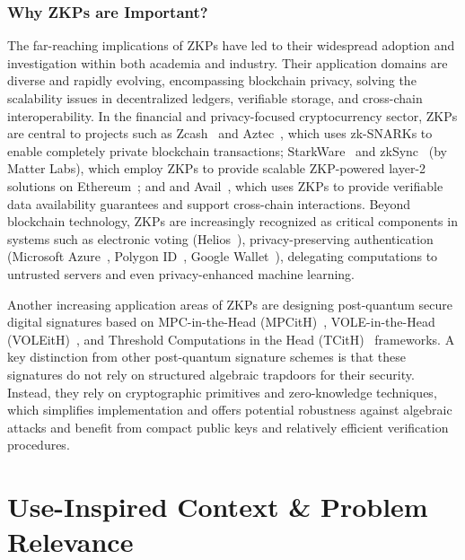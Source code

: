 \subsubsection{Why ZKPs are Important?}
\vspace*{-0.1cm}
The far-reaching implications of ZKPs have led to their widespread adoption and investigation within both academia and industry.
Their application domains are diverse and rapidly evolving, encompassing blockchain privacy, solving the scalability issues in decentralized ledgers, verifiable storage, and cross-chain interoperability.
In the financial and privacy-focused cryptocurrency sector, ZKPs are central to projects such as Zcash~\cite{zcash} and Aztec~\cite{aztec}, which uses zk-SNARKs to enable completely private blockchain transactions; StarkWare~\cite{starkware} and zkSync~\cite{zksync} (by Matter Labs), which employ ZKPs to provide scalable ZKP-powered layer-2 solutions on Ethereum~\cite{ethereum}; and and Avail~\cite{avail}, which uses ZKPs to provide verifiable data availability guarantees and support cross-chain interactions. 
Beyond blockchain technology, ZKPs are increasingly recognized as critical components in systems such as electronic voting (Helios~\cite{helios}), privacy-preserving authentication (Microsoft Azure~\cite{azureprivacy}, Polygon ID~\cite{polygonid}, Google Wallet~\cite{googlewallet}), delegating computations to untrusted servers and even privacy-enhanced machine learning.

Another increasing application areas of ZKPs are designing post-quantum secure digital signatures based on MPC-in-the-Head (MPCitH)~\cite{}, VOLE-in-the-Head (VOLEitH)~\cite{}, and Threshold Computations in the Head (TCitH)~\cite{} frameworks.
A key distinction from other post-quantum signature schemes is that these signatures do not rely on structured algebraic trapdoors for their security.
Instead, they rely on cryptographic primitives and zero-knowledge techniques, which simplifies implementation and offers potential robustness against algebraic attacks and benefit from compact public keys and relatively efficient verification procedures.

\section{Use-Inspired Context \& Problem Relevance}

